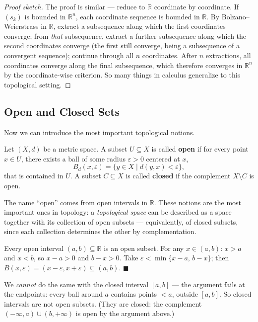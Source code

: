 \documentclass[11pt]{report}
\begin{document}
\begin{proof}[Proof sketch]
The proof is similar --- reduce to $\mathbb{R}$ coordinate by coordinate. If $(s_k)$ is bounded in $\mathbb{R}^n$, each coordinate sequence is bounded in $\mathbb{R}$. By Bolzano--Weierstrass in $\mathbb{R}$, extract a subsequence along which the first coordinates converge; from \emph{that} subsequence, extract a further subsequence along which the second coordinates converge (the first still converge, being a subsequence of a convergent sequence); continue through all $n$ coordinates. After $n$ extractions, all coordinates converge along the final subsequence, which therefore converges in $\mathbb{R}^n$ by the coordinate-wise criterion. So many things in calculus generalize to this topological setting.
\end{proof}

\subsection{Open and Closed Sets}

Now we can introduce the most important topological notions.

\begin{defbox}
Let $(X,d)$ be a metric space. A subset $U \subseteq X$ is called \textbf{open} if for every point $x \in U$, there exists a ball of some radius $\varepsilon > 0$ centered at $x$,
\[
B_d(x, \varepsilon) = \{ y \in X \mid d(y,x) < \varepsilon \},
\]
that is contained in $U$. A subset $C \subseteq X$ is called \textbf{closed} if the complement $X \setminus C$ is open.
\end{defbox}

The name ``open'' comes from open intervals in $\mathbb{R}$. These notions are the most important ones in topology: a \emph{topological space} can be described as a space together with its collection of open subsets --- equivalently, of closed subsets, since each collection determines the other by complementation.

\begin{exbox}
Every open interval $(a,b) \subseteq \mathbb{R}$ is an open subset. For any $x \in (a,b)$: $x > a$ and $x < b$, so $x - a > 0$ and $b - x > 0$. Take $\varepsilon < \min\{x - a,\, b - x\}$; then $B(x,\varepsilon) = (x - \varepsilon, x + \varepsilon) \subseteq (a,b)$. \hfill $\blacksquare$

We \emph{cannot} do the same with the closed interval $[a,b]$ --- the argument fails at the endpoints: every ball around $a$ contains points $< a$, outside $[a,b]$. So closed intervals are not open subsets. (They are closed: the complement $(-\infty, a) \cup (b, +\infty)$ is open by the argument above.)
\end{exbox}
\end{document}
